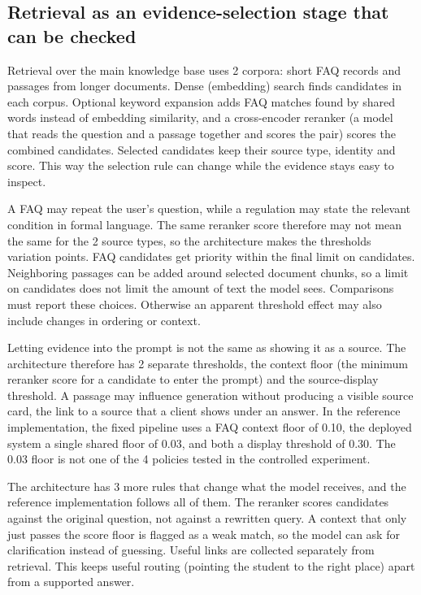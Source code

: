 \subsection{Retrieval as an evidence-selection stage that can be checked}

Retrieval over the main knowledge base uses 2 corpora: short FAQ records and passages from longer documents. Dense (embedding) search finds candidates in each corpus. Optional keyword expansion adds FAQ matches found by shared words instead of embedding similarity, and a cross-encoder reranker (a model that reads the question and a passage together and scores the pair) scores the combined candidates. Selected candidates keep their source type, identity and score. This way the selection rule can change while the evidence stays easy to inspect.

A FAQ may repeat the user's question, while a regulation may state the relevant condition in formal language. The same reranker score therefore may not mean the same for the 2 source types, so the architecture makes the thresholds variation points. FAQ candidates get priority within the final limit on candidates. Neighboring passages can be added around selected document chunks, so a limit on candidates does not limit the amount of text the model sees. Comparisons must report these choices. Otherwise an apparent threshold effect may also include changes in ordering or context.

Letting evidence into the prompt is not the same as showing it as a source. The architecture therefore has 2 separate thresholds, the context floor (the minimum reranker score for a candidate to enter the prompt) and the source-display threshold. A passage may influence generation without producing a visible source card, the link to a source that a client shows under an answer. In the reference implementation, the fixed pipeline uses a FAQ context floor of 0.10, the deployed system a single shared floor of 0.03, and both a display threshold of 0.30. The 0.03 floor is not one of the 4 policies tested in the controlled experiment.

The architecture has 3 more rules that change what the model receives, and the reference implementation follows all of them. The reranker scores candidates against the original question, not against a rewritten query. A context that only just passes the score floor is flagged as a weak match, so the model can ask for clarification instead of guessing. Useful links are collected separately from retrieval. This keeps useful routing (pointing the student to the right place) apart from a supported answer.

